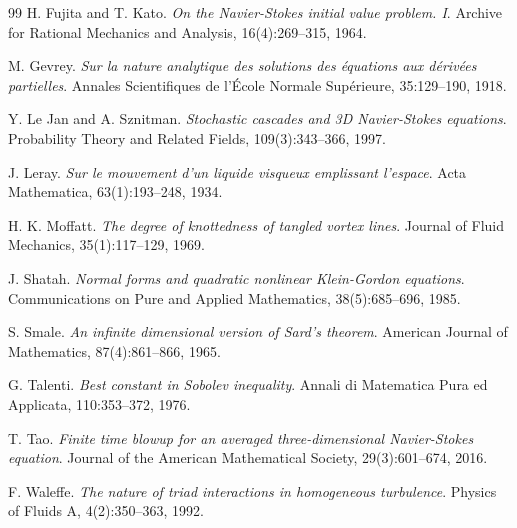 \documentclass[12pt,a4paper]{article}
\theoremstyle{plain}
\theoremstyle{definition}
\theoremstyle{remark}
\begin{document}
\begin{thebibliography}{99}
 H. Fujita and T. Kato. \textit{On the Navier-Stokes initial value problem. I}. Archive for Rational Mechanics and Analysis, 16(4):269--315, 1964.

 M. Gevrey. \textit{Sur la nature analytique des solutions des équations aux dérivées partielles}. Annales Scientifiques de l'École Normale Supérieure, 35:129--190, 1918.

 Y. Le Jan and A. Sznitman. \textit{Stochastic cascades and 3D Navier-Stokes equations}. Probability Theory and Related Fields, 109(3):343--366, 1997.

 J. Leray. \textit{Sur le mouvement d'un liquide visqueux emplissant l'espace}. Acta Mathematica, 63(1):193--248, 1934.

 H. K. Moffatt. \textit{The degree of knottedness of tangled vortex lines}. Journal of Fluid Mechanics, 35(1):117--129, 1969.

 J. Shatah. \textit{Normal forms and quadratic nonlinear Klein-Gordon equations}. Communications on Pure and Applied Mathematics, 38(5):685--696, 1985.

 S. Smale. \textit{An infinite dimensional version of Sard's theorem}. American Journal of Mathematics, 87(4):861--866, 1965.

 G. Talenti. \textit{Best constant in Sobolev inequality}. Annali di Matematica Pura ed Applicata, 110:353--372, 1976.

 T. Tao. \textit{Finite time blowup for an averaged three-dimensional Navier-Stokes equation}. Journal of the American Mathematical Society, 29(3):601--674, 2016.

 F. Waleffe. \textit{The nature of triad interactions in homogeneous turbulence}. Physics of Fluids A, 4(2):350--363, 1992.

\end{thebibliography}
\end{document}
